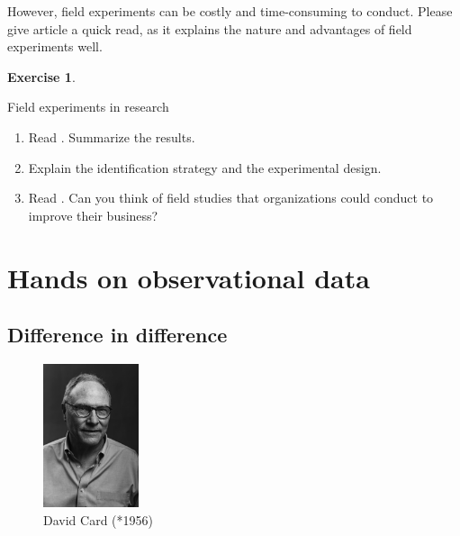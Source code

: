 \documentclass[
  12pt,
  oneside]{book}
\providecommand{\tightlist}{%
  \setlength{\itemsep}{0pt}\setlength{\parskip}{0pt}}
\theoremstyle{definition}
\theoremstyle{definition}
\theoremstyle{definition}
\newtheorem{exercise}{Exercise}[chapter]
\theoremstyle{definition}
\theoremstyle{remark}
\begin{document}
However, field experiments can be costly and time-consuming to conduct. Please give \citet{Harrison2004Field} article a quick read, as it explains the nature and advantages of field experiments well.

\begin{exercise}
\protect\hypertarget{exr:fieldexperiments}{}\label{exr:fieldexperiments}

Field experiments in research

\begin{enumerate}
\def\labelenumi{\alph{enumi})}
\tightlist
\item
  Read \citet{Fehr2007Do}. Summarize the results.
\item
  Explain the identification strategy and the experimental design.
\item
  Read \citet{Bandiera2011Field}. Can you think of field studies that organizations could conduct to improve their business?
\end{enumerate}

\end{exercise}

\hypertarget{hands-on-observational-data}{%
\chapter{Hands on observational data}\label{hands-on-observational-data}}

\hypertarget{difference-in-difference}{%
\section{Difference in difference}\label{difference-in-difference}}

\begin{figure}
\centering
\includegraphics[width=0.25\textwidth,height=\textheight]{fig/dcard1.jpg}
\caption[\label{fig:dcard} David Card (*1956)]{\label{fig:dcard} David Card (*1956)\footnotemark{}}
\end{figure}
\end{document}

